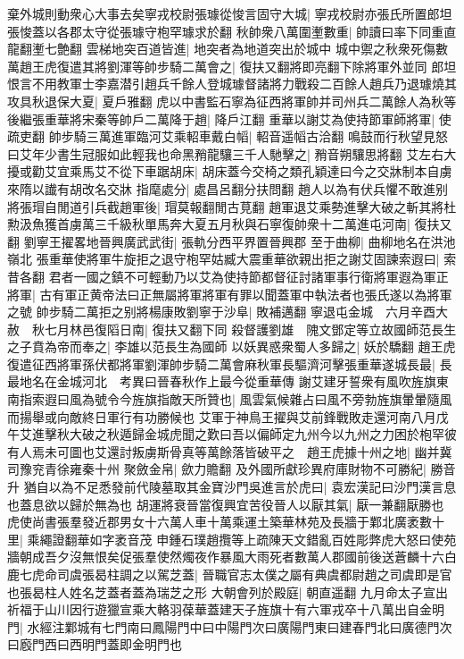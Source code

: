 棄外城則動衆心大事去矣寧戎校尉張璩從悛言固守大城|{
	寧戎校尉亦張氏所置郎坦張悛蓋以各郡太守從張璩守枹罕璩求於翻}
秋帥衆八萬圍壍數重|{
	帥讀曰率下同重直龍翻壍七艶翻}
雲梯地突百道皆進|{
	地突者為地道突出於城中}
城中禦之秋衆死傷數萬趙王虎復遣其將劉渾等帥步騎二萬會之|{
	復扶又翻將即亮翻下除將軍外並同}
郎坦恨言不用教軍士李嘉潜引趙兵千餘人登城璩督諸將力戰殺二百餘人趙兵乃退璩燒其攻具秋退保大夏|{
	夏戶雅翻}
虎以中書監石寧為征西將軍帥并司州兵二萬餘人為秋等後繼張重華將宋秦等帥戶二萬降于趙|{
	降戶江翻}
重華以謝艾為使持節軍師將軍|{
	使疏吏翻}
帥步騎三萬進軍臨河艾乘軺車戴白幍|{
	軺音遥幍古洽翻}
鳴鼓而行秋望見怒曰艾年少書生冠服如此輕我也命黑矟龍驤三千人馳擊之|{
	矟音朔驤思將翻}
艾左右大擾或勸艾宜乘馬艾不從下車踞胡床|{
	胡床蓋今交椅之類孔穎達曰今之交牀制本自虜來隋以䜟有胡改名交牀}
指麾處分|{
	處昌呂翻分扶問翻}
趙人以為有伏兵懼不敢進别將張瑁自閒道引兵截趙軍後|{
	瑁莫報翻閒古莧翻}
趙軍退艾乘勢進擊大破之斬其將杜勲汲魚獲首虜萬三千級秋單馬奔大夏五月秋與石寧復帥衆十二萬進屯河南|{
	復扶又翻}
劉寧王擢畧地晉興廣武武街|{
	張軌分西平界置晉興郡}
至于曲柳|{
	曲柳地名在洪池嶺北}
張重華使將軍牛旋拒之退守枹罕姑臧大震重華欲親出拒之謝艾固諫索遐曰|{
	索昔各翻}
君者一國之鎮不可輕動乃以艾為使持節都督征討諸軍事行衛將軍遐為軍正將軍|{
	古有軍正黄帝法曰正無屬將軍將軍有罪以聞蓋軍中執法者也張氏遂以為將軍之號}
帥步騎二萬拒之别將楊康敗劉寧于沙阜|{
	敗補邁翻}
寧退屯金城　六月辛酉大赦　秋七月林邑復䧟日南|{
	復扶又翻下同}
殺督護劉雄　隗文鄧定等立故國師范長生之子賁為帝而奉之|{
	李雄以范長生為國師}
以妖異惑衆蜀人多歸之|{
	妖於驕翻}
趙王虎復遣征西將軍孫伏都將軍劉渾帥步騎二萬會麻秋軍長驅濟河擊張重華遂城長最|{
	長最地名在金城河北　考異曰晉春秋作上最今從重華傳}
謝艾建牙誓衆有風吹旌旗東南指索遐曰風為號令今旌旗指敵天所贊也|{
	風雲氣候雜占曰風不旁勃旌旗暈暈隨風而揚舉或向敵終日軍行有功勝候也}
艾軍于神鳥王擢與艾前鋒戰敗走還河南八月戊午艾進擊秋大破之秋遁歸金城虎聞之歎曰吾以偏師定九州今以九州之力困於枹罕彼有人焉未可圖也艾還討叛虜斯骨真等萬餘落皆破平之　趙王虎據十州之地|{
	幽并冀司豫兖青徐雍秦十州}
聚斂金帛|{
	歛力贍翻}
及外國所獻珍異府庫財物不可勝紀|{
	勝音升}
猶自以為不足悉發前代陵墓取其金寶沙門吳進言於虎曰|{
	袁宏漢記曰沙門漢言息也蓋息欲以歸於無為也}
胡運將衰晉當復興宜苦役晉人以厭其氣|{
	厭一兼翻厭勝也}
虎使尚書張羣發近郡男女十六萬人車十萬乘運土築華林苑及長牆于鄴北廣袤數十里|{
	乘繩證翻華如字袤音茂}
申鍾石璞趙攬等上疏陳天文錯亂百姓彫弊虎大怒曰使苑牆朝成吾夕沒無恨矣促張羣使然燭夜作暴風大雨死者數萬人郡國前後送蒼麟十六白鹿七虎命司虞張曷柱調之以駕芝蓋|{
	晉職官志太僕之屬有典虞都尉趙之司虞即是官也張曷柱人姓名芝蓋者蓋為瑞芝之形}
大朝會列於殿庭|{
	朝直遥翻}
九月命太子宣出祈福于山川因行遊獵宣乘大輅羽葆華蓋建天子旌旗十有六軍戎卒十八萬出自金明門|{
	水經注鄴城有七門南曰鳳陽門中曰中陽門次曰廣陽門東曰建春門北曰廣德門次曰廏門西曰西明門蓋即金明門也}
